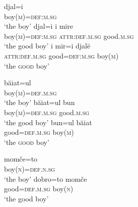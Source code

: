 \begin{exe}
\ex 
{} 
\begin{xlist}
\ex
\label{definfl alb}
\gll	djal=i\\
	boy(\textsc{m})=\textsc{def:m.sg}\\
\glt	‘the boy’
\ex
\label{encl alb a}
\gll	djal=i 				i 			mire\\
	boy(\textsc{m})=\textsc{def:m.sg} 	\textsc{attr:def.m.sg}	good.\textsc{m.sg}\\
\glt	‘the good boy’
\ex
\label{encl alb b}
\gll	i 			mir=i 			djalë\\
	\textsc{attr:def.m.sg} 	good=\textsc{def:m.sg} 	boy(\textsc{m})\\
\glt	‘the \textsc{good} boy’ 
\end{xlist}
\ex 
{}
\begin{xlist}
\ex
\label{definfl rum}
\gll	băiat=ul\\
	boy(\textsc{m})=\textsc{def.m.sg}\\
\glt	‘the boy’
\ex
\label{encl rum a}
\gll	băiat=ul 				bun\\
	boy(\textsc{m})=\textsc{def.m.sg} 	good.\textsc{m.sg}\\
\glt	‘the good boy’
\ex
\label{encl rum b}
\gll	bun=ul 				băiat\\
	good=\textsc{def.m.sg} 	boy(\textsc{m})\\
\glt	‘the \textsc{good} boy’
\end{xlist}
\ex
{}
\begin{xlist}
\ex
\label{definfl bg}
\gll	momče=to\\
	boy(\textsc{n})=\textsc{def.n.sg}\\
\glt	‘the boy’
\ex
\label{encl bg}
\gll	dobro=to 		momče\\
	good=\textsc{def.m.sg}	boy(\textsc{n})\\
\glt	‘the good boy’
\end{xlist}	
\end{exe}

